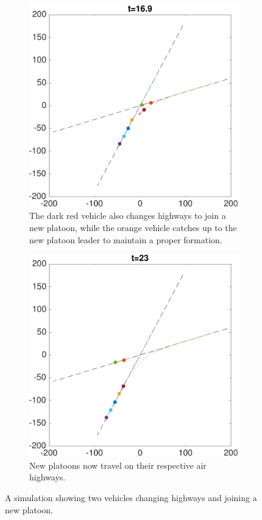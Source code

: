 \begin{figure}
    \begin{subfigure}[t]{0.23\textwidth} \label{subfig:ch_170}
        \includegraphics[width=\textwidth]{fig/ch_170}
        \caption{The dark red vehicle also changes highways to join a new platoon, while the orange vehicle catches up to the new platoon leader to maintain a proper formation.}
    \end{subfigure}
    \begin{subfigure}[t]{0.23\textwidth} \label{subfig:ch_231}
        \includegraphics[width=\textwidth]{fig/ch_231}
        \caption{New platoons now travel on their respective air highways.}
    \end{subfigure}   
    \caption{A simulation showing two vehicles changing highways and joining a new platoon. \label{fig:ch}}
\end{figure}
